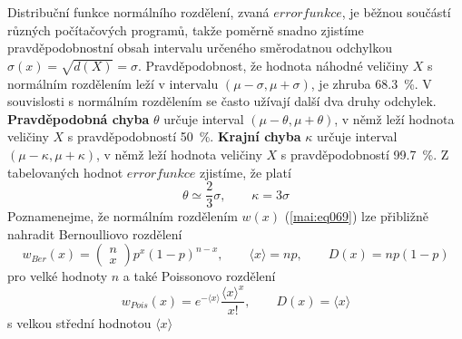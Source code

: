 \begin{example}
  
  Distribuční funkce normálního rozdělení, zvaná \(errorfunkce\), je běžnou součástí různých 
  počítačových programů, takže poměrně snadno zjistíme pravděpodobnostní obsah intervalu určeného 
  směrodatnou odchylkou \(\sigma(x) = \sqrt{d(X)} = \sigma\). Pravděpodobnost, že hodnota náhodné 
  veličiny \(X\) s normálním rozdělením leží v intervalu \((\mu - \sigma, \mu + \sigma)\), je 
  zhruba \SI{68.3}{\percent}. V souvislosti s normálním rozdělením se často užívají další 
  dva druhy odchylek. \textbf{Pravděpodobná chyba} \(\theta\) určuje interval \((\mu - \theta, \mu 
  + \theta)\), v  němž leží hodnota veličiny \(X\) s pravděpodobností \SI{50}{\percent}. 
  \textbf{Krajní chyba} \(\kappa\) určuje interval \((\mu - \kappa, \mu + \kappa)\), v němž leží 
  hodnota veličiny \(X\) s pravděpodobností \SI{99.7}{\percent}. Z tabelovaných hodnot 
  \(errorfunkce\) zjistíme, že platí
  \begin{equation}\label{mai:eq71}
   \theta \simeq \dfrac{2}{3}\sigma, \qquad \kappa = 3\sigma
  \end{equation}
  Poznamenejme, že normálním rozdělením \(w(x)\) (\ref{mai:eq069}) lze přibližně nahradit 
  Bernoulliovo rozdělení
  \begin{equation*}
    w_{Ber}(x) = \begin{pmatrix} n \\ x \end{pmatrix}p^x(1 - p)^{n-x},\qquad
    \langle x \rangle = np, \qquad
    D(x) = np(1-p)
  \end{equation*}
  pro velké hodnoty \(n\) a také Poissonovo rozdělení
  \begin{equation*}
    w_{Pois}(x) = e^{-\langle x \rangle}\dfrac{\langle x \rangle^x}{x!}, \qquad 
    D(x) = \langle x \rangle
  \end{equation*}
  s velkou střední hodnotou \(\langle x \rangle\)
\normalsize
\end{example}